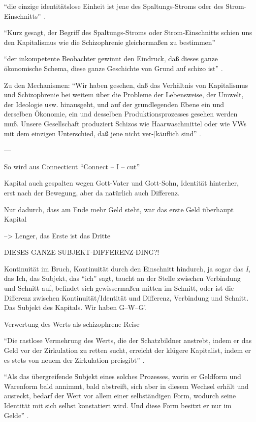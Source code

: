\documentclass[12pt,
               DIV13,
               paper=a4,
               twoside=false,
               onehalfspacing,
               bibliography=totoc,
               toc=graduated,
               draft,
               ]{scrartcl}
\newcommand{\pc}[2]{\parencite[#1]{#2}}
\newcommand{\gwg}{G--W--G'\xspace}
\begin{document}
"`die einzige identitätslose Einheit ist jene des Spaltungs-Stroms
oder des Strom-Einschnitts"' \pc{314}{ao}.

"`Kurz gesagt, der Begriff des Spaltungs-Stroms oder Strom-Einschnitts
schien uns den Kapitalismus wie die Schizophrenie gleichermaßen zu
bestimmen"'

"`der inkompetente Beobachter gewinnt den Eindruck, daß dieses ganze
ökonomische Schema, diese ganze Geschichte von Grund auf schizo ist"'
\pc{306}{ao}.

Zu den Mechanismen: "`Wir haben gesehen, daß das Verhältnis von
Kapitalismus und Schizophrenie bei weitem über die Probleme der
Lebensweise, der Umwelt, der Ideologie usw. hinausgeht, und auf der
grundlegenden Ebene ein und derselben Ökonomie, ein und desselben
Produktionsprozesses gesehen werden muß. Unsere Gesellschaft
produziert Schizos wie Haarwaschmittel oder wie VWs mit dem einzigen
Unterschied, daß jene nicht ver-|käuflich sind"' \pc{S. 315 f.}{ao}.


---

So wird aus Connecticut "`Connect -- I -- cut"' \pc{48}{ao}

Kapital auch gespalten wegen Gott-Vater und Gott-Sohn, Identität
hinterher, erst nach der Bewegung, aber da natürlich auch Differenz.

Nur dadurch, dass am Ende mehr Geld steht, war das erste Geld
überhaupt Kapital

--> Lenger, das Erste ist das Dritte

DIESES GANZE SUBJEKT-DIFFERENZ-DING?!

Kontinuität im Bruch, Kontinuität durch den Einschnitt hindurch, ja
sogar das \emph{I}, das Ich, das Subjekt, das "`ich"' sagt, taucht an
der Stelle zwischen Verbindung und Schnitt auf, befindet sich
gewissermaßen mitten im Schnitt, oder ist die Differenz zwischen
Kontinuität/Identität und Differenz, Verbindung und Schnitt. Das
Subjekt des Kapitals. Wir haben \gwg.

Verwertung des Werts als schizophrene Reise

"`Die rastlose Vermehrung des Werts, die der Schatzbildner anstrebt,
indem er das Geld vor der Zirkulation zu retten sucht, erreicht der
klügere Kapitalist, indem er es stets von neuem der Zirkulation
preisgibt"' \pc{168}{kap}.

"`Als das übergreifende Subjekt eines solches Prozesses, worin er
Geldform und Warenform bald annimmt, bald abstreift, sich aber in
diesem Wechsel erhält und ausreckt, bedarf der Wert vor allem einer
selbständigen Form, wodurch seine Identität mit sich selbst
konstatiert wird. Und diese Form besitzt er nur im Gelde"'
\pc{169}{kap}.
\end{document}
